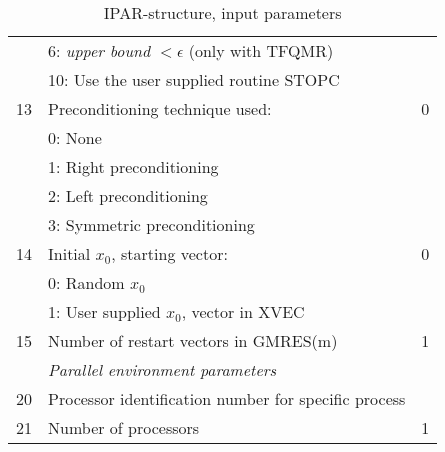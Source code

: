 \documentclass[11pt,a4paper,english,oneside]{report}
\begin{document}
\begin{table}[H]
\begin{tabular*}{\textwidth}{lll}
	& 6: {\em upper bound} $< \epsilon$ (only with TFQMR)	& \\
	& 10: Use the user supplied routine {\ttfamily STOPC} 	&\\
13	& Preconditioning technique used: 			& 0 \\
	& 0: None 						& \\
	& 1: Right preconditioning 				& \\
	& 2: Left preconditioning 				& \\
	& 3: Symmetric preconditioning 				& \\
14 	& Initial $x_{0}$, starting vector: 			& 0 \\
	& 0: Random $x_{0}$					& \\
	& 1: User supplied $x_{0}$, vector in {\ttfamily XVEC} 	& \\
15	& Number of restart vectors in GMRES(m)		 	& 1 \\
\hline
	& {\em Parallel environment parameters} 		& \\
\hline
20 	& Processor identification number for specific process 	& \\
21 	& Number of processors 					& 1 \\
\hline\hline
\end{tabular*}

\caption{IPAR-structure, input parameters}
\label{table:ipar-input}
\end{table}
\end{document}
